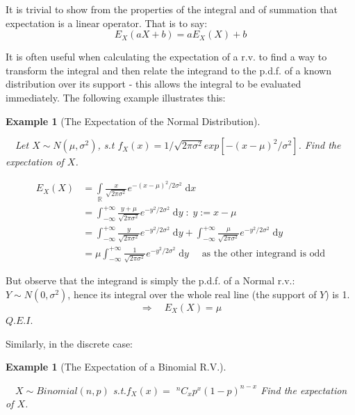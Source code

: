 \documentclass[12pt,a4paper]{article}
\newtheorem{ex}[thm]{Example}
\begin{document}
It is trivial to show from the properties of the integral and of summation that expectation is a linear operator. That is to say:
$$E_{X}(aX + b) = aE_{X}(X) + b$$

It is often useful when calculating the expectation of a r.v. to find a way to transform the integral and then relate the integrand to the p.d.f. of a known distribution over its support - this allows the integral to be evaluated immediately. The following example illustrates this:

\begin{ex}[The Expectation of the Normal Distribution]$\;$\par
\vspace{1cm}

$\quad$Let $X \sim N(\mu, \sigma^2)$, s.t $f_X(x) = 1/\sqrt{2 \pi \sigma^2} exp[-(x - \mu)^2/\sigma^2]$. Find the expectation of $X$.
\end{ex}

\begin{align*}
E_{X}(X) &= \int\limits_{\mathbb{R}}\!\! \frac{x}{\sqrt{2 \pi \sigma^2}} e^{-(x - \mu)^2/2\sigma^2}\;\mathrm{d}x\\
&= \int_{-\infty}^{+\infty}\!\!\frac{y + \mu}{\sqrt{2 \pi \sigma^2}}e^{-y^2/2\sigma^2}\;\mathrm{d}y \; : \; y := x - \mu \\
&= \int_{-\infty}^{+\infty}\!\! \frac{y}{\sqrt{2 \pi \sigma^2}}e^{-y^2/2\sigma^2}\;\mathrm{d}y + \int_{-\infty}^{+\infty} \!\!\frac{\mu}{\sqrt{2 \pi \sigma^2}}e^{-y^2/2\sigma^2}\;\mathrm{d}y \\
&= \mu \int_{-\infty}^{+\infty} \!\!\frac{1}{\sqrt{2 \pi \sigma^2}}e^{-y^2/2\sigma^2}\;\mathrm{d}y\quad \text{ as the other integrand is odd}
\end{align*}

But observe that the integrand is simply the p.d.f. of a Normal r.v.: $Y \sim N(0,\sigma^2)$, hence its integral over the whole real line (the support of $Y$) is 1.
$$\Rightarrow \quad E_{X}(X) = \mu$$
\hfill $Q.E.I.$

\noindent Similarly, in the discrete case:

\begin{ex}[The Expectation of a Binomial R.V.]$\;$\par
\vspace{1cm}

$\quad X \sim Binomial(n, p)$ s.t.$f_X(x) =$ $^nC_x p^x (1 - p)^{n - x}$ Find the expectation of $X$.
\end{ex}
\end{document}
